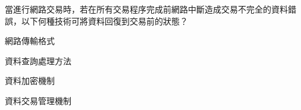 \ifx\ntpcNinetyTwo\undefined[92學年基北區] \fi
當進行網路交易時，若在所有交易程序完成前網路中斷造成交易不完全的資料錯誤，以下何種技術可將資料回復到交易前的狀態？
  \begin{optionlist}
  \item 網路傳輸格式
  \item 資料查詢處理方法
  \item 資料加密機制
  \item 資料交易管理機制\label{ntpc-92-a38}
  \end{optionlist}